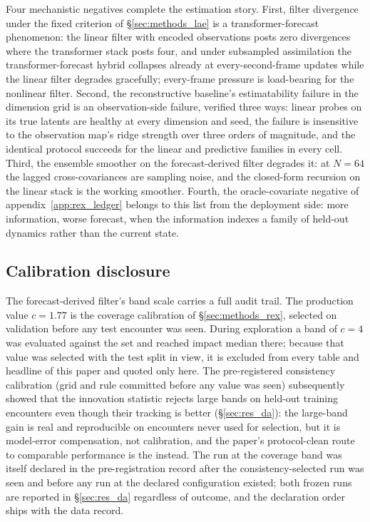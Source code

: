 Four mechanistic negatives complete the estimation story. First, filter
divergence under the fixed criterion of \S\ref{sec:methods_lae} is a
transformer-forecast phenomenon: the linear filter with encoded
observations posts zero divergences where the transformer stack posts
four, and under subsampled assimilation the transformer-forecast hybrid
collapses already at every-second-frame updates while the linear filter
degrades gracefully; every-frame pressure is load-bearing for the
nonlinear filter. Second, the reconstructive baseline's estimatability
failure in the dimension grid is an observation-side failure, verified
three ways: linear probes on its true latents are healthy at every
dimension and seed, the failure is insensitive to the observation map's
ridge strength over three orders of magnitude, and the identical protocol
succeeds for the linear and predictive families in every cell. Third, the
ensemble smoother on the forecast-derived filter degrades it: at
$N = 64$ the lagged cross-covariances are sampling noise, and the
closed-form recursion on the linear stack is the working smoother.
Fourth, the oracle-covariate negative of appendix~\ref{app:rex_ledger}
belongs to this list from the deployment side: more information, worse
forecast, when the information indexes a family of held-out dynamics
rather than the current state.

\subsection{Calibration disclosure}
\label{app:calibration}

The forecast-derived filter's band scale carries a full audit trail. The
production value $c = 1.77$ is the coverage calibration of
\S\ref{sec:methods_rex}, selected on validation before any test encounter
was seen. During exploration a band of $c = 4$ was evaluated against
the \TestSplit{} set and reached \PoneExcludedBandFour{} impact median there; because
that value was selected with the test split in view, it is excluded from
every table and headline of this paper and quoted only here. The
pre-registered consistency calibration (grid and rule committed before
any value was seen) subsequently showed that the innovation statistic
rejects large bands on held-out training encounters even though their
tracking is better (\S\ref{sec:res_da}): the large-band gain is real and
reproducible on encounters never used for selection, but it is model-error
compensation, not calibration, and the paper's protocol-clean route to
comparable performance is the \TwoStageKF{} instead. The \TwoStageKF{}
run at the coverage band was itself declared in the pre-registration
record after the consistency-selected run was seen and before any run at
the declared configuration existed; both frozen runs are reported in
\S\ref{sec:res_da} regardless of outcome, and the declaration order ships
with the data record.
